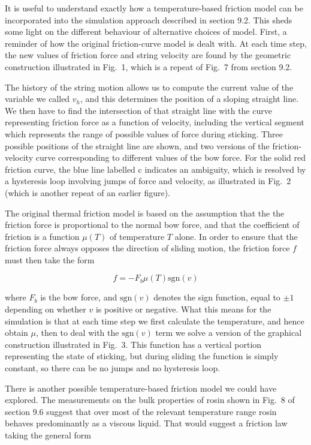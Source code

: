   It is useful to understand exactly how a temperature-based friction model can 
  be incorporated into the simulation approach described in section 9.2. This 
  sheds some light on the different behaviour of alternative choices of model. 
  First, a reminder of how the original friction-curve model is dealt with. At 
  each time step, the new values of friction force and string velocity are 
  found by the geometric construction illustrated in Fig.\ 1, which is a repeat 
  of Fig.\ 7 from section 9.2. 

  The history of the string motion allows us to compute the current value of 
  the variable we called $v_h$, and this determines the position of a sloping 
  straight line. We then have to find the intersection of that straight line 
  with the curve representing friction force as a function of velocity, 
  including the vertical segment which represents the range of possible values 
  of force during sticking. Three possible positions of the straight line are 
  shown, and two versions of the friction-velocity curve corresponding to 
  different values of the bow force. For the solid red friction curve, the blue 
  line labelled c indicates an ambiguity, which is resolved by a hysteresis 
  loop involving jumps of force and velocity, as illustrated in Fig.\ 2 (which 
  is another repeat of an earlier figure). 

  The original thermal friction model is based on the assumption that the the 
  friction force is proportional to the normal bow force, and that the 
  coefficient of friction is a function $\mu(T)$ of temperature $T$ alone. In 
  order to ensure that the friction force always opposes the direction of 
  sliding motion, the friction force $f$ must then take the form 

  $$f=-F_b \mu(T) \mathrm{sgn}(v) \tag{1}$$ 

  where $F_b$ is the bow force, and $\mathrm{sgn}(v)$ denotes the sign 
  function, equal to $\pm1$ depending on whether $v$ is positive or negative. 
  What this means for the simulation is that at each time step we first 
  calculate the temperature, and hence obtain $\mu$, then to deal with the 
  $\mathrm{sgn}(v)$ term we solve a version of the graphical construction 
  illustrated in Fig.\ 3. This function has a vertical portion representing the 
  state of sticking, but during sliding the function is simply constant, so 
  there can be no jumps and no hysteresis loop. 

  There is another possible temperature-based friction model we could have 
  explored. The measurements on the bulk properties of rosin shown in Fig.\ 8 
  of section 9.6 suggest that over most of the relevant temperature range rosin 
  behaves predominantly as a viscous liquid. That would suggest a friction law 
  taking the general form 

